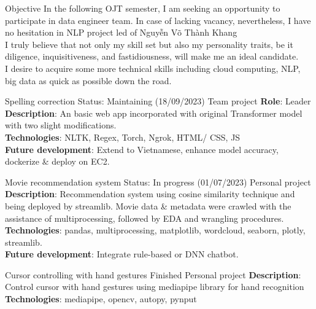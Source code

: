 \documentclass[11pt]{spidercv}
\begin{document}
	\begin{MainPart}
		\MainTitle{\ColorHighlight}{\ColorTextMain}{}
		\Experience
		{\ColorHighlight}
		{\Large Objective}
		{}
		{}
		{
			In the following OJT semester, I am seeking an opportunity to participate in data engineer team. In case of lacking vacancy, nevertheless, I have no hesitation in NLP project led of Nguy\~{ê}n Võ Thành Khang\\
			\vspace{.15cm}
			I truly believe that not only my skill set but also my personality traits, be it diligence, inquisitiveness, and fastidiousness, will make me an ideal candidate.\\
			\vspace{.15cm}
			I desire to acquire some more technical skills including cloud computing, NLP, big data as quick as possible down the road.
		}


		\Experience
		{\ColorHighlight}
		{Spelling correction}
		{Status: Maintaining (18/09/2023)}
		{Team project}
		{
		 \textbf{Role}: Leader\\
		 \vspace{.15cm}
		 \textbf{Description}: An basic web app incorporated with original Transformer model with two slight modifications.\\
		 \vspace{.15cm}
		 \textbf{Technologies}: NLTK, Regex, Torch, Ngrok, HTML/ CSS, JS\\
		 \vspace{.15cm}
		 \textbf{Future development}: Extend to Vietnamese, enhance model accuracy, dockerize \& deploy on EC2.
		}
		
		
		\Experience
		{\ColorHighlight}
		{Movie recommendation system}
		{Status: In progress (01/07/2023)}
		{Personal project}
		{
			\textbf{Description}: Recommendation system using cosine similarity technique and being deployed by streamlib. Movie data \& metadata were crawled with the assistance of multiprocessing, followed by EDA and wrangling procedures.\\
			\vspace{.15cm}
			\textbf{Technologies}: pandas, multiprocessing, matplotlib, wordcloud, seaborn, plotly, streamlib.\\
			\vspace{.15cm}
			\textbf{Future development}: Integrate rule-based or DNN chatbot.
		}
		
		
		\Experience
		{\ColorHighlight}
		{Cursor controlling with hand gestures}
		{Finished}
		{Personal project}
		{
			\textbf{Description}: Control cursor with hand gestures using mediapipe library for hand recognition\\
			\vspace{.15cm}
			\textbf{Technologies}: mediapipe, opencv, autopy, pynput\\
			\vspace{.15cm}
		}
	\end{MainPart}
\end{document}
